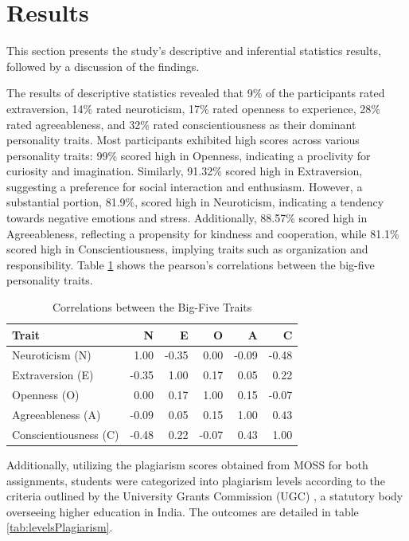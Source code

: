 \section{Results}
\label{sec:findings}
This section presents the study's descriptive and inferential statistics results, followed by a discussion of the findings.

The results of descriptive statistics revealed that 9\% of the participants rated extraversion, 14\% rated neuroticism, 17\% rated openness to experience, 28\% rated agreeableness, and 32\% rated conscientiousness as their dominant personality traits. Most participants exhibited high scores across various personality traits: 99\% scored high in Openness, indicating a proclivity for curiosity and imagination. Similarly, 91.32\% scored high in Extraversion, suggesting a preference for social interaction and enthusiasm. However, a substantial portion, 81.9\%, scored high in Neuroticism, indicating a tendency towards negative emotions and stress. Additionally, 88.57\% scored high in Agreeableness, reflecting a propensity for kindness and cooperation, while 81.1\% scored high in Conscientiousness, implying traits such as organization and responsibility. Table \ref{tab:correl} shows the pearson's correlations between the big-five personality traits. 

\vspace{-4pt}
\begin{table}[h]
  \centering
  \caption{Correlations between the Big-Five Traits\label{tab:correl}}
  \vspace{-12pt}
  \begin{tabular}{p{3cm}rrrrr}
    \toprule
    Trait & N & E & O & A & C \\\midrule
    Neuroticism (N) & 1.00 & -0.35 & 0.00 & -0.09 & -0.48 \\
    Extraversion (E) & -0.35 & 1.00 & 0.17 & 0.05 &	0.22 \\
    Openness (O) & 0.00 & 0.17 & 1.00 &	0.15 & -0.07 \\
    Agreeableness (A) & -0.09 &	0.05 & 0.15 & 1.00 & 0.43 \\ 
    Conscientiousness (C) & -0.48 & 0.22 & -0.07 &	0.43 &	1.00  \\\bottomrule
  \end{tabular}\vspace{-8pt}
\end{table}

Additionally, utilizing the plagiarism scores obtained from MOSS for both assignments, students were categorized into plagiarism levels according to the criteria outlined by the University Grants Commission (UGC) \cite{UGCPlagiarism}, a statutory body overseeing higher education in India. The outcomes are detailed in table \ref{tab:levelsPlagiarism}.


